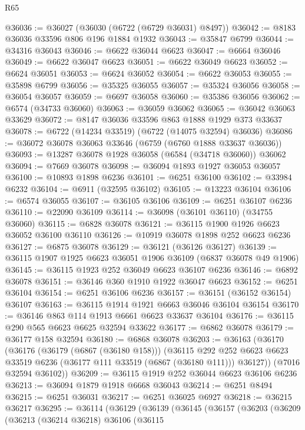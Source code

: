 \begin{lexlean}{R65}
\begin{coremodule}
{@36036 := @36027 (@36030 (@6722 (@6729 @36031) @8497))
@36042 := @8183 @36036 @33596 @806 @196 @1884 @1932
@36043 := @35847 @6799
@36044 := @34316 @36043
@36046 := @6622 @36044 @6623
@36047 := @6664 @36046
@36049 := @6622 @36047 @6623
@36051 := @6622 @36049 @6623
@36052 := @6624 @36051
@36053 := @6624 @36052
@36054 := @6622 @36053
@36055 := @35898 @6799
@36056 := @35325 @36055
@36057 := @35324 @36056
@36058 := @36054 @36057
@36059 := @6697 @36058
@36060 := @35386 @36056
@36062 := @6574 (@34733 @36060)
@36063 := @36059 @36062
@36065 := @36042 @36063 @33629
@36072 := @8147 @36036 @33596 @863 @1888 @1929 @373 @33637
@36078 := @6722 (@14234 @33519) (@6722 (@14075 @32594) @36036)
@36086 := @36072 @36078 @36063 @33646 (@6759 (@6760 @1888 @33637 @36036))
@36093 := @13287 @36078 @1928 @36058 (@6584 (@34718 @36060)) @36062
@36094 := @7669 @36078
@36098 := @36094 @1893 @1927 @36053 @36057
@36100 := @10893 @1898 @6236
@36101 := @6251 @36100
@36102 := @33984 @6232
@36104 := @6911 (@32595 @36102)
@36105 := @13223 @36104
@36106 := @6574 @36055
@36107 := @36105 @36106
@36109 := @6251 @36107 @6236
@36110 := @22090 @36109
@36114 := @36098 (@36101 @36110) (@34755 @36060)
@36115 := @6828 @36078
@36121 := @36115 @1900 @1926 @6623 @36052 @36100 @36110
@36126 := @10919 @36078 @1898 @252 @6623 @6236
@36127 := @6875 @36078
@36129 := @36121 (@36126 @36127)
@36139 := @36115 @1907 @1925 @6623 @36051 @1906 @36109 (@6837 @36078 @49 @1906)
@36145 := @36115 @1923 @252 @36049 @6623 @36107 @6236
@36146 := @6892 @36078
@36151 := @36146 @360 @1910 @1922 @36047 @6623
@36152 := @6251 @36104
@36154 := @6251 @36106 @6236
@36157 := @36151 (@36152 @36154) @36107
@36163 := @36115 @1914 @1921 @6663 @36046 @36104 @36154
@36170 := @36146 @863 @114 @1913 @6661 @6623 @33637 @36104
@36176 := @36115 @290 @565 @6623 @6625 @32594 @33622
@36177 := @6862 @36078
@36179 := @36177 @158 @32594
@36180 := @6868 @36078
@36203 := @36163
    (@36170
      (@36176
        (@36179 (@6867 (@36180 @158)))
        (@36115
          @292
          @252
          @6623
          @6623
          @33519
          @6236
          (@36177 @111 @33519 (@6867 (@36180 @111)))
          @36127))
      (@7016 @32594 @36102))
@36209 := @36115 @1919 @252 @36044 @6623 @36106 @6236
@36213 := @36094 @1879 @1918 @6668 @36043
@36214 := @6251 @8494
@36215 := @6251 @36031
@36217 := @6251 @36025 @6927
@36218 := @36215 @36217
@36295 := @36114
    (@36129
      (@36139
        (@36145
          (@36157
            (@36203
              (@36209
                (@36213
                  (@36214 @36218)
                  @36106
                  (@36115
}
\end{coremodule}
\end{lexlean}
